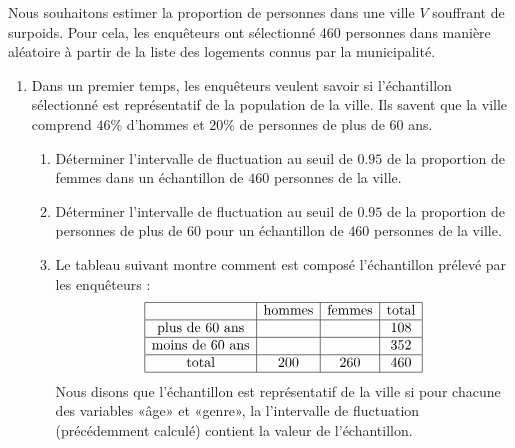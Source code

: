 
\begin{exercice}\label{exosmath-0349}

    Nous souhaitons estimer la proportion de personnes dans une ville \( V\) souffrant de surpoids. Pour cela, les enquêteurs ont sélectionné \( 460\) personnes dans manière aléatoire à partir de la liste des logements connus par la municipalité.
    \begin{enumerate}
        \item
            Dans un premier temps, les enquêteurs veulent savoir si l'échantillon sélectionné est représentatif de la population de la ville. Ils savent que la ville comprend \( 46\%\) d'hommes et \( 20\%\) de personnes de plus de \( 60\) ans.
            \begin{enumerate}
                \item
                    Déterminer l'intervalle de fluctuation au seuil de \( 0.95\) de la proportion de femmes dans un échantillon de \( 460\) personnes de la ville.
                \item
                    Déterminer l'intervalle de fluctuation au seuil de \( 0.95\) de la proportion de personnes de plus de \( 60\) pour un échantillon de \( 460\) personnes de la ville.
                \item
                    Le tableau suivant montre comment est composé l'échantillon prélevé par les enquêteurs :
                    \begin{equation*}
                        \begin{array}[]{|c|c|c|c|}
                            \hline
                            &\text{hommes}&\text{femmes}&\text{total}\\
                            \hline
                            \text{plus de \( 60\) ans}&&&108\\
                            \hline
                            \text{moins de \( 60\) ans}&&&352\\
                            \hline
                            \text{total}&200&260&460\\
                            \hline
                        \end{array}
                    \end{equation*}
                    Nous disons que l'échantillon est représentatif de la ville si pour chacune des variables «âge» et «genre», la l'intervalle de fluctuation (précédemment calculé) contient la valeur de l'échantillon.


\end{enumerate}
\end{enumerate}
\end{exercice}
